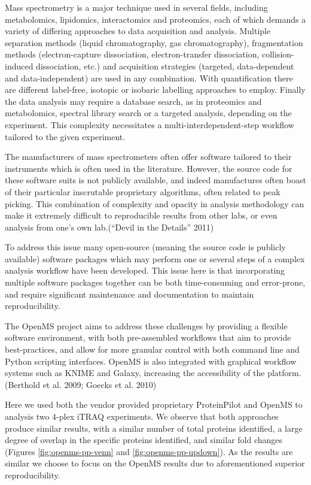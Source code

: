 \documentclass[9pt,lineno]{elife}
\begin{document}
\begin{landscape}
\begin{landscape}
Mass spectrometry is a major technique used in several fields, including metabolomics, lipidomics, interactomics and proteomics, each of which demands a variety of differing approaches to data acquisition and analysis.
Multiple separation methods (liquid chromatography, gas chromatography), fragmentation methods (electron-capture dissociation, electron-transfer dissociation, collision-induced dissociation, etc.) and acquisition strategies (targeted, data-dependent and data-independent) are used in any combination.
With quantification there are different label-free, isotopic or isobaric labelling approaches to employ.
Finally the data analysis may require a database search, as in proteomics and metabolomics, spectral library search or a targeted analysis, depending on the experiment.
This complexity necessitates a multi-interdependent-step workflow tailored to the given experiment.

The manufacturers of mass spectrometers often offer software tailored to their instruments which is often used in the literature.
However, the source code for these software suits is not publicly available, and indeed manufactures often boast of their particular inscrutable proprietary algorithms, often related to peak picking.
This combination of complexity and opacity in analysis methodology can make it extremely difficult to reproducible results from other labs, or even analysis from one's own lab.({``Devil in the Details''} 2011)

To address this issue many open-source (meaning the source code is publicly available) software packages which may perform one or several steps of a complex analysis workflow have been developed.
This issue here is that incorporating multiple software packages together can be both time-consuming and error-prone, and require significant maintenance and documentation to maintain reproducibility.

The OpenMS project aims to address these challenges by providing a flexible software environment, with both pre-assembled workflows that aim to provide best-practices, and allow for more granular control with both command line and Python scripting interfaces.
OpenMS is also integrated with graphical workflow systems such as KNIME and Galaxy, increasing the accessibility of the platform.(Berthold et al. 2009; Goecks et al. 2010)

Here we used both the vendor provided proprietary ProteinPilot and OpenMS to analysis two 4-plex iTRAQ experiments.
We observe that both approaches produce similar results, with a similar number of total proteins identified, a large degree of overlap in the specific proteins identified, and similar fold changes (Figures \ref{fig:openms-pp-venn} and \ref{fig:openms-pp-updown}).
As the results are similar we choose to focus on the OpenMS results due to aforementioned superior reproducibility.


\end{landscape}
\end{landscape}
\end{document}
